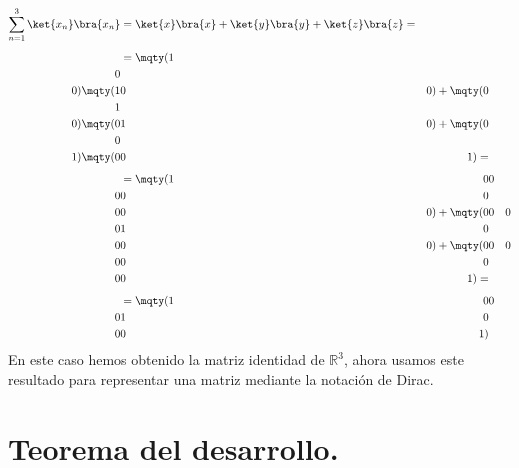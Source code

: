 \begin{align*}
\sum_{n=1}^{3} \ket{x_{n}} \bra{x_{n}} &= \ket{x} \bra{x} + \ket{y} \bra{y} + \ket{z} \bra{z} = \\[0.5em]
&=
\mqty(1 \\ 0 \\ 0) \mqty(1 & 0 & 0) + \mqty(0 \\ 1 \\ 0) \mqty(0 & 1 & 0) + \mqty(0 \\ 0 \\ 1) \mqty(0 & 0 & 1) = \\[0.5em]
&= 
\mqty(
1 & 0 & 0 \\
0 & 0 & 0 \\
0 & 0 & 0
) +
\mqty(
0 & 0 & 0 \\
0 & 1 & 0 \\
0 & 0 & 0
) + 
\mqty(
0 & 0 & 0 \\
0 & 0 & 0 \\
0 & 0 & 1
) = \\[0.5em]
&= \mqty(
1 & 0 & 0 \\
0 & 1 & 0 \\
0 & 0 & 1
)  
\end{align*}
En este caso hemos obtenido la matriz identidad de $\mathbb{R}^{3}$, ahora usamos este resultado para representar una matriz mediante la notación de Dirac.

\section{Teorema del desarrollo.}


